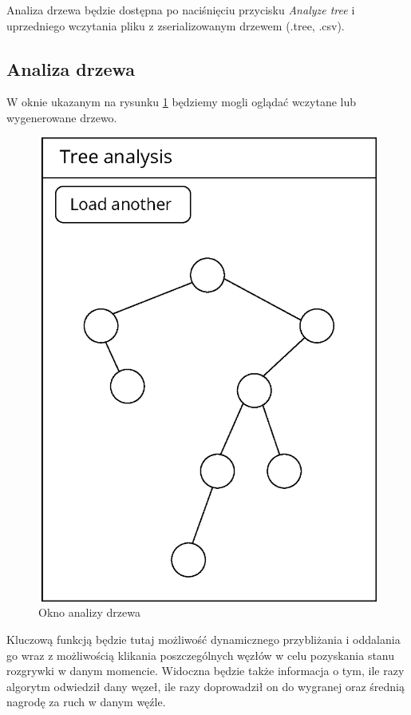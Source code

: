 \documentclass{article}
\begin{document}
	\noindent Analiza drzewa będzie dostępna po naciśnięciu przycisku \textit{Analyze tree} i uprzedniego wczytania pliku z zserializowanym drzewem (.tree, .csv).
	
	\clearpage
	\subsection{Analiza drzewa}
	W oknie ukazanym na rysunku \ref{rys:analyze_tree} będziemy mogli oglądać wczytane lub wygenerowane drzewo. 
	\begin{figure}[h!]
		\centering
		\includegraphics[scale=0.8]{analyze-eps}
		\caption{Okno analizy drzewa}
		\label{rys:analyze_tree}
	\end{figure}
	
	\noindent Kluczową funkcją będzie tutaj możliwość dynamicznego przybliżania i oddalania go wraz z możliwością klikania poszczególnych węzłów w celu pozyskania stanu rozgrywki w danym momencie. Widoczna będzie także informacja o tym, ile razy algorytm odwiedził dany węzeł, ile razy doprowadził on do wygranej oraz średnią nagrodę za ruch w danym węźle.
	
\end{document}
